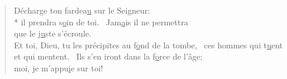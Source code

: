 \begin{verse}
Décharge ton fardea\underline{u} sur le Seigneur: \\*
il prendra s\underline{o}in de toi.~\psalmstar
Jam\underline{a}is il ne permettra \\
que le j\underline{u}ste s’écroule. \\

Et toi, Dieu, tu les précipites au f\underline{o}nd de la tombe,~\psalmdagger
ces hommes qui t\underline{u}ent et qui mentent.~\psalmstar
Ils s’en iront dans la f\underline{o}rce de l’âge; \\
moi, je m’appu\underline{i}e sur toi! \\
\end{verse}


